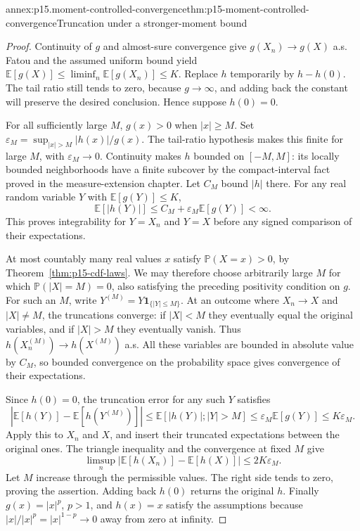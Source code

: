 \begin{annexitem}{annex:p15.moment-controlled-convergence}{thm:p15-moment-controlled-convergence}{Truncation under a stronger-moment bound}
\begin{proof}
Continuity of \(g\) and almost-sure convergence give
\(g(X_n)\to g(X)\) a.s. Fatou and the assumed uniform bound yield
\(\mathbb E[g(X)]\leq\liminf_n\mathbb E[g(X_n)]\leq K\).
Replace \(h\) temporarily by \(h-h(0)\). The tail ratio still
tends to zero, because \(g\to\infty\), and adding back the
constant will preserve the desired conclusion. Hence suppose \(h(0)=0\).

For all sufficiently large \(M\), \(g(x)>0\) when \(|x|\geq M\).
Set \(\varepsilon_M=\sup_{|x|>M}|h(x)|/g(x)\). The tail-ratio
hypothesis makes this finite for large \(M\), with
\(\varepsilon_M\to0\). Continuity makes \(h\) bounded on
\([-M,M]\): its locally bounded neighborhoods have a finite
subcover by the compact-interval fact proved in the measure-extension
chapter. Let \(C_M\) bound \(|h|\) there. For any real random
variable \(Y\) with \(\mathbb E[g(Y)]\leq K\),
\[
 \mathbb E[|h(Y)|]\leq C_M+\varepsilon_M\mathbb E[g(Y)]<\infty.
\]
This proves integrability for \(Y=X_n\) and \(Y=X\) before
any signed comparison of their expectations.

At most countably many real values \(x\) satisfy \(\mathbb P(X=x)>0\), by
Theorem~\ref{thm:p15-cdf-laws}. We may therefore choose arbitrarily
large \(M\) for which \(\mathbb P(|X|=M)=0\), also satisfying
the preceding positivity condition on \(g\). For such an \(M\),
write \(Y^{(M)}=Y\mathbf1_{\{|Y|\leq M\}}\). At an outcome
where \(X_n\to X\) and \(|X|\ne M\), the truncations converge:
if \(|X|<M\) they eventually equal the original variables, and
if \(|X|>M\) they eventually vanish. Thus
\(h(X_n^{(M)})\to h(X^{(M)})\) a.s. All these variables are
bounded in absolute value by \(C_M\), so bounded convergence on
the probability space gives convergence of their expectations.

Since \(h(0)=0\), the truncation error for any such \(Y\) satisfies
\[
 \left|\mathbb E[h(Y)]-\mathbb E[h(Y^{(M)})]\right|
 \leq\mathbb E[|h(Y)|;|Y|>M]
 \leq\varepsilon_M\mathbb E[g(Y)]\leq K\varepsilon_M.
\]
Apply this to \(X_n\) and \(X\), and insert their truncated
expectations between the original ones. The triangle inequality and
the convergence at fixed \(M\) give
\[
 \limsup_n\left|\mathbb E[h(X_n)]-\mathbb E[h(X)]\right|
                         \leq2K\varepsilon_M.
\]
Let \(M\) increase through the permissible values. The right side
tends to zero, proving the assertion. Adding back \(h(0)\) returns
the original \(h\). Finally \(g(x)=|x|^p\), \(p>1\), and
\(h(x)=x\) satisfy the assumptions because
\(|x|/|x|^p=|x|^{1-p}\to0\) away from zero at infinity.
\end{proof}
\end{annexitem}
